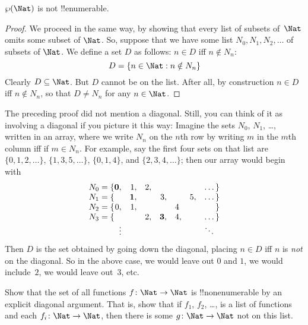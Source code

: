 \documentclass[../../../include/open-logic-section]{subfiles}
\begin{document}
\begin{thm}
$\Pow{\Nat}$ is not !!{enumerable}.
\end{thm}

\begin{proof}
We proceed in the same way, by showing that every list of subsets
of~$\Nat$ omits some subset of $\Nat$. So, suppose that we have some
list $N_0, N_1, N_2, \ldots$ of subsets of $\Nat$. We define a set $D$
as follows: $n \in D$ iff $n \notin N_{n}$:
\[
D = \Setabs{n \in \Nat}{n \notin N_n}
\]
Clearly $D\subseteq \Nat$. But $D$ cannot be on the list. After all,
by construction $n \in D$ iff $n\notin N_n$, so that $D \neq N_n$ for
any $n \in \Nat$. 
\end{proof}

\begin{explain}
The preceding proof did not mention a diagonal. Still, you can think
of it as involving a diagonal if you picture it this way: Imagine the
sets $N_0$, $N_1$, \dots, written in an array, where we write $N_n$ on
the $n$th row by writing $m$ in the $m$th column iff if $m \in N_n$.
For example, say the first four sets on that list are
$\{0,1,2,\dots\}$, $\{1, 3, 5, \dots\}$, $\{0,1,4\}$, and
$\{2,3,4,\dots\}$; then our array would begin with
\[
\begin{array}{r@{}rrrrrrr}
  N_0 = \{ & \mathbf{0}, & 1, & 2, & & & & \dots\}\\
  N_1 = \{ &  & \mathbf{1}, &  & 3, &  & 5, & \dots\}\\
  N_2 = \{ & 0, & 1, &  &  & 4\phantom{,} &  & \}\\
  N_3 = \{ &  &  & 2, & \mathbf{3}, & 4, & & \dots\}\\
  &\vdots & & & & & & \ddots\phantom{\}}
  \end{array}
\]
Then $D$ is the set obtained by going down the diagonal, placing $n
\in D$ iff $n$ is \emph{not} on the diagonal. So in the above case, we
would leave out $0$ and $1$, we would include~$2$, we would leave
out~$3$, etc.
\end{explain}

\begin{prob}
Show that the set of all functions $f \colon \Nat \to \Nat$ is
!!{nonenumerable} by an explicit diagonal argument. That is, show that
if $f_1$, $f_2$, \dots, is a list of functions and each $f_i\colon
\Nat \to \Nat$, then there is some $g \colon \Nat \to
\Nat$ not on this list.
\end{prob}
\end{document}
